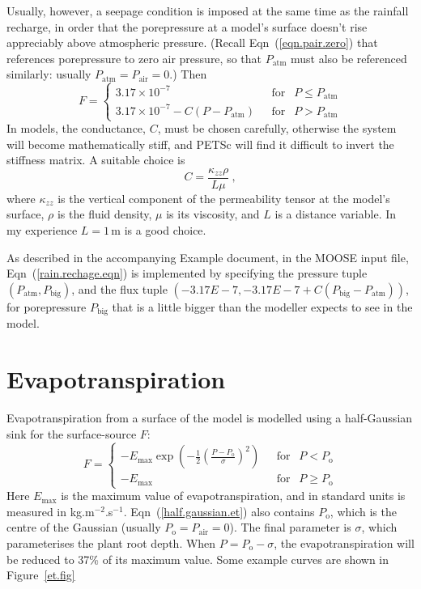 \documentclass[]{scrreprt}
\begin{document}
Usually, however, a seepage condition is imposed at the same time as
the rainfall recharge, in order that the porepressure at a model's
surface doesn't rise appreciably above atmospheric pressure.  (Recall
Eqn~(\ref{eqn.pair.zero}) that references porepressure to zero air
pressure, so that $P_{\mathrm{atm}}$ must also be referenced
similarly: usually $P_{\mathrm{atm}} = P_{\mathrm{air}} = 0$.) Then
\begin{equation}
F = \left\{
\begin{array}{ll}
3.17\times 10^{-7} & \ \ \ \mbox{for }\ \ P\leq P_{\mathrm{atm}} \\
3.17\times 10^{-7} - C(P-P_{\mathrm{atm}}) & \ \ \ \mbox{for }\ \ P >
P_{\mathrm{atm}}
\end{array}
\right.
\label{rain.rechage.eqn}
\end{equation}
In models, the conductance, $C$, must be chosen carefully, otherwise
the system will become mathematically stiff, and PETSc will find it
difficult to invert the stiffness matrix.  A suitable choice is
\begin{equation}
C = \frac{\kappa_{zz}\rho}{L\mu} \ ,
\label{cond.typical.eqn}
\end{equation}
where $\kappa_{zz}$ is the vertical component of the permeability
tensor at the model's surface, $\rho$ is the fluid density, $\mu$
is its viscosity, and $L$ is a distance variable.  In my experience
$L=1$\,m is a good choice.

As described in the accompanying Example document, in the MOOSE input
file, Eqn~(\ref{rain.rechage.eqn}) is implemented by specifying the
pressure tuple $(P_{\mathrm{atm}}, P_{\mathrm{big}})$, and the flux
tuple $(-3.17E-7, -3.17E-7 + C(P_{\mathrm{big}}-P_{\mathrm{atm}}))$,
for porepressure $P_{\mathrm{big}}$ that is a little bigger than the
modeller expects to see in the model.

\section{Evapotranspiration}
\label{et.section.}

Evapotranspiration from a surface of the model is modelled using a
half-Gaussian sink for the surface-source $F$:
\begin{equation}
F = \left\{
\begin{array}{ll}
-E_{\mathrm{max}} \exp\left(
-\frac{1}{2}\left(\frac{P-P_{\mathrm{o}}}{\sigma}\right)^{2} \right) &
\ \ \ \mbox{for } \ \ P<P_{\mathrm{o}} \\
-E_{\mathrm{max}} & \ \ \ \mbox{for } \ \ P\geq P_{\mathrm{o}}
\end{array}
\right.
\label{half.gaussian.et}
\end{equation}
Here $E_{\mathrm{max}}$ is the maximum value of evapotranspiration,
and in standard units is measured in kg.m$^{-2}$.s$^{-1}$.
Eqn~(\ref{half.gaussian.et}) also contains $P_{\mathrm{o}}$, which is the centre
of the Gaussian (usually $P_{\mathrm{o}}=P_{\mathrm{air}}=0$).  The final parameter is $\sigma$, which
parameterises the plant root depth.  When $P = P_{\mathrm{o}} - \sigma$, the
evapotranspiration will be reduced to 37\% of its maximum value.  Some
example curves are shown in Figure~\ref{et.fig}
\end{document}
